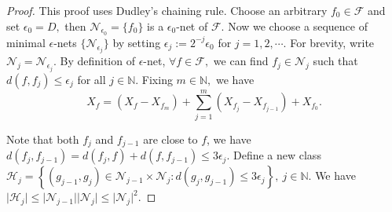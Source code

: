 \documentclass{article}
\begin{document}
\begin{proof}
This proof uses Dudley's chaining rule. Choose an arbitrary $f_0\in\mathcal{F}$ and set $\epsilon_0 = D,$ then $\mathcal{N}_{\epsilon_0}=\{f_0\}$ is a $\epsilon_0$-net of $\mathcal{F}.$ Now we choose a sequence of minimal $\epsilon$-nets $\{\mathcal{N}_{\epsilon_j}\}$ by setting $\epsilon_j := 2^{-j}\epsilon_0$ for $j=1,2,\cdots.$ For brevity, write $\mathcal{N}_j=\mathcal{N}_{\epsilon_j}.$ By definition of $\epsilon$-net, $\forall f\in\mathcal{F},$ we can find $f_j\in\mathcal{N}_{j}$ such that $d(f,f_j)\leq \epsilon_j$ for all $j\in\mathbb{N}.$ Fixing $m\in\mathbb{N},$ we have
\begin{equation*}
	X_f = (X_f - X_{f_m}) + \sum_{j=1}^m\left(X_{f_j} - X_{f_{j-1}}\right) + X_{f_0}.\tag{5.4}
\end{equation*}

Note that both $f_j$ and $f_{j-1}$ are close to $f$, we have $d(f_j, f_{j-1}) = d(f_j,f) + d(f,f_{j-1}) \leq 3\epsilon_{j}.$ Define a new class $\mathcal{H}_j = \left\{(g_{j-1},g_j)\in\mathcal{N}_{j-1}\times\mathcal{N}_j: d(g_{j},g_{j-1})\leq 3\epsilon_{j}\right\},\ j\in\mathbb{N}.$ We have $\vert\mathcal{H}_j\vert\leq\vert\mathcal{N}_{j-1}\vert\vert\mathcal{N}_j\vert\leq\vert\mathcal{N}_j\vert^2.$


\end{proof}
\end{document}

